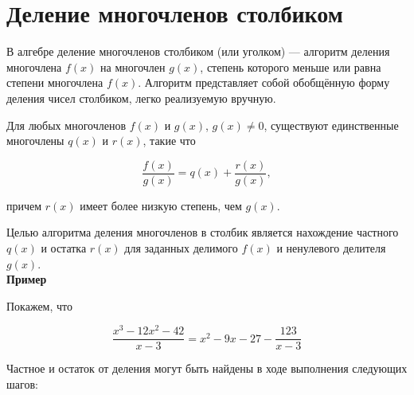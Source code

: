 \documentclass[12pt,a4paper]{scrartcl}
\begin{document}
	
\section{Деление многочленов столбиком}

В алгебре деление многочленов столбиком (или уголком) — алгоритм деления многочлена $f(x)$ на многочлен $g(x)$, степень которого меньше или равна степени многочлена $f(x)$. Алгоритм представляет собой обобщённую форму деления чисел столбиком, легко реализуемую вручную.

Для любых многочленов $f(x)$ и $g(x)$, $g(x) \ne 0$, существуют единственные многочлены $q(x)$ и $r(x)$, такие что

$$\frac{f(x)}{g(x)}=q(x) + \frac{r(x)}{g(x)},$$

причем $r(x)$ имеет более низкую степень, чем $g(x)$.

Целью алгоритма деления многочленов в столбик является нахождение частного $q(x)$ и остатка $r(x)$ для заданных делимого $f(x)$ и ненулевого делителя $g(x)$.\\

\textbf{Пример}

Покажем, что

$$\frac{x^3 - 12x^2 - 42}{x-3} = x^2 - 9x - 27 - \frac{123}{x-3}$$

Частное и остаток от деления могут быть найдены в ходе выполнения следующих шагов:
\end{document}
